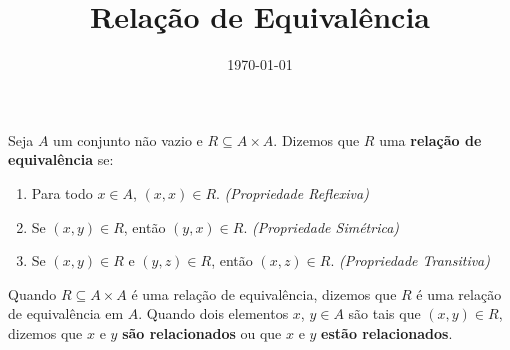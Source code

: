 \documentclass{beamer}
\title{Rela\c{c}\~ao de Equival\^encia}
\author[\autor]{\autor}
\institute[\instituto]{\instituto}
\date{\today}
\begin{document}
    \begin{frame}
        \maketitle
    \end{frame}


    \begin{frame}
        \begin{definicao}
            Seja $A$ um conjunto n{\~a}o vazio \pause e $R\subseteq A \times A$. \pause Dizemos que $R$  uma \textbf{rela{\c c}{\~a}o de equival{\^e}ncia} se:\pause
            \begin{enumerate}[label={\roman*})]
                \item Para todo $x \in A$, \pause $(x,x) \in R$. \pause \textit{(Propriedade Reflexiva)}\pause
                \item Se $(x, y) \in R$, \pause ent\~ao $(y, x) \in R$. \pause \textit{(Propriedade Sim\'etrica)}\pause
                \item Se $(x, y) \in R$ \pause e $(y, z) \in R$, \pause ent\~ao $(x, z)\in R$. \pause \textit{(Propriedade Transitiva)}\pause
            \end{enumerate}
        \end{definicao}

        Quando $R\subseteq A \times A$ {\'e} uma rela{\c c}{\~a}o de equival{\^e}ncia, dizemos que $R$ {\'e} uma rela{\c c}{\~a}o de equival{\^e}ncia em $A$. Quando dois elementos $x$, $y \in A$ s{\~a}o tais que $(x,y) \in R$, dizemos que $x$ e $y$ \textbf{s{\~a}o relacionados} ou que $x$ e $y$ \textbf{est\~ao relacionados}.
    \end{frame}
\end{document}
